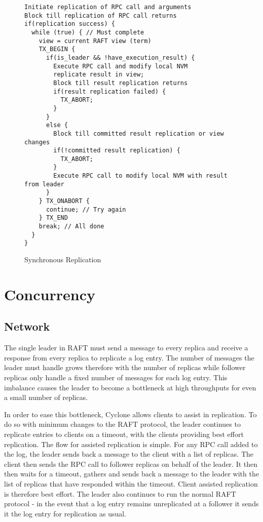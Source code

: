 \documentclass[twocolumn]{article}
\begin{document}
\begin{figure*}
\centering
\begin{minipage}{0.7\textwidth}  
{ \scriptsize
\begin{verbatim}
Initiate replication of RPC call and arguments
Block till replication of RPC call returns
if(replication success) {  
  while (true) { // Must complete 
    view = current RAFT view (term)
    TX_BEGIN {
      if(is_leader && !have_execution_result) {
        Execute RPC call and modify local NVM
        replicate result in view;
        Block till result replication returns
        if(result replication failed) {
          TX_ABORT;
        }
      }
      else {
        Block till committed result replication or view changes
        if(!committed result replication) {
          TX_ABORT;
        }
        Execute RPC call to modify local NVM with result from leader
      }
    } TX_ONABORT {
      continue; // Try again
    } TX_END
    break; // All done
  }
}
\end{verbatim}
}
\end{minipage}
\caption{Synchronous Replication}
\label{fig:sync_rep}
\end{figure*}

\section{Concurrency}
\subsection{Network}
The single leader in RAFT must send a message to every replica and receive a
response from every replica to replicate a log entry. The number of
messages the leader must handle grows therefore with the number of replicas
while follower replicas only handle a fixed number of
messages for each log entry. This imbalance causes the leader to become a
bottleneck at high throughputs for even a small number of replicas.

In order to ease this bottleneck, Cyclone allows clients to assist in
replication. To do so with minimum changes to the RAFT protocol, the leader
continues to replicate entries to clients on a timeout, with the clients
providing best effort replication. The flow for assisted replication is
simple. For any RPC call added to the log, the leader sends back a message to
the client with a list of replicas. The client then sends the RPC call to
follower replicas on behalf of the leader. It then then waits for a timeout,
gathers and sends back a message to the leader with the list of replicas that
have responded within the timeout. Client assisted replication is therefore best
effort. The leader also continues to run the normal RAFT protocol - in the event
that a log entry remains unreplicated at a follower it sends it the log entry
for replication as usual.
\end{document}
